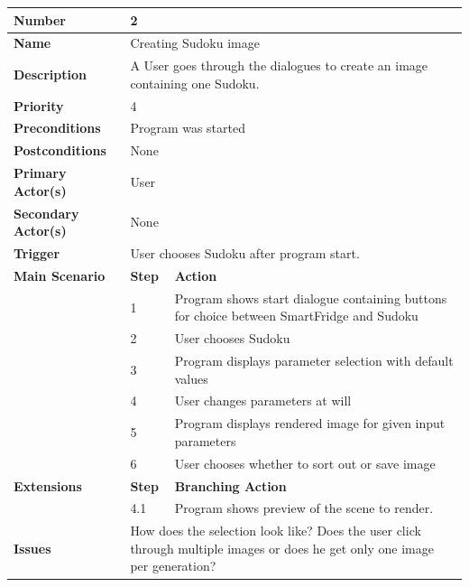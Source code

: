 \documentclass[a4paper,12pt]{article}
\begin{document}
\begin{tabularx}{\linewidth}{|l|l|X|}
\hline
\textbf{Number} & \multicolumn{2}{l|}{2} \\
\hline
\textbf{Name} & \multicolumn{2}{l|}{Creating Sudoku image} \\
\hline
\textbf{Description} &  \multicolumn{2}{X|}{A User goes through the dialogues to create an image containing one Sudoku.} \\
\hline
\textbf{Priority} & \multicolumn{2}{l|}{4} \\
\hline
\textbf{Preconditions} & \multicolumn{2}{l|}{Program was started} \\
\hline
\textbf{Postconditions} & \multicolumn{2}{l|}{None} \\
\hline
\textbf{Primary Actor(s)} & \multicolumn{2}{l|}{User} \\
\hline
\textbf{Secondary Actor(s)} & \multicolumn{2}{l|}{None} \\
\hline
\textbf{Trigger} & \multicolumn{2}{l|}{User chooses Sudoku after program start.} \\
\hline
\textbf{Main Scenario} & \textbf{Step} & \textbf{Action} \\
\hline
 & 1 & Program shows start dialogue containing buttons for choice between SmartFridge and Sudoku\\
\cline{2-3}
 & 2 & User chooses Sudoku \\
\cline{2-3}
 & 3 & Program displays parameter selection with default values\\
\cline{2-3}
 & 4 & User changes parameters at will \\
\cline{2-3}
 & 5 & Program displays rendered image for given input parameters \\
\cline{2-3}
 & 6 & User chooses whether to sort out or save image \\
\hline
\textbf{Extensions} & \textbf{Step} & \textbf{Branching Action} \\
\hline
& 4.1 & Program shows preview of the scene to render. \\
\hline
\textbf{Issues} & \multicolumn{2}{X|}{How does the selection look like? Does the user click through multiple images or does he get only one image per generation?} \\
\hline
\end{tabularx}
 \\
 \\
 \\
\end{document}
